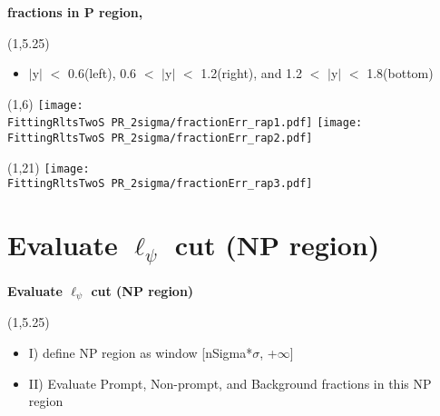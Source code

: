 \documentclass[11pt,slidescentered,red,compress,handout,hyperref={bookmarks=true},mathseriftable]{beamer}
\newcommand{\lpsi}{\ell_{\psi}}
\newcommand{\FittingRltsOneS}{../Psi1S/Fit/parameter/evaluateCtau/}
\newcommand{\FittingRltsTwoS}{../Psi2S/Fit/parameter/evaluateCtau/}
\begin{document}
\begin{frame}[t]{\small \bf fractions in P region,  }{}
\begin{textblock}{48}(1,5.25)
\begin{itemize}
\scriptsize \item $|$y$|$ $<$ 0.6(left), 0.6 $<$ $|$y$|$ $<$ 1.2(right), and 1.2 $<$ $|$y$|$ $<$ 1.8(bottom)
\end{itemize}
\end{textblock}
\begin{textblock}{48}(1,6)
\hspace*{10pt} \texttt{[image: \\FittingRltsTwoS PR\_2sigma/fractionErr\_rap1.pdf]}
\hspace*{10pt} \texttt{[image: \\FittingRltsTwoS PR\_2sigma/fractionErr\_rap2.pdf]}
\begin{textblock}{48}(1,21)
\hspace*{10pt} \texttt{[image: \\FittingRltsTwoS PR\_2sigma/fractionErr\_rap3.pdf]}
\end{textblock}
\end{textblock}
\end{frame}


\section{Evaluate $\lpsi$ cut (NP region)} 
\begin{frame}[t]{\small \bf Evaluate $\lpsi$ cut (NP region)}{}
\begin{textblock}{48}(1,5.25)
\begin{itemize}
\scriptsize \item I) define NP region as window [nSigma*$\sigma$, +$\infty$]
\scriptsize \item II) Evaluate Prompt, Non-prompt, and Background fractions in this NP region
\end{itemize}
\end{textblock}
\end{frame}
\end{document}
